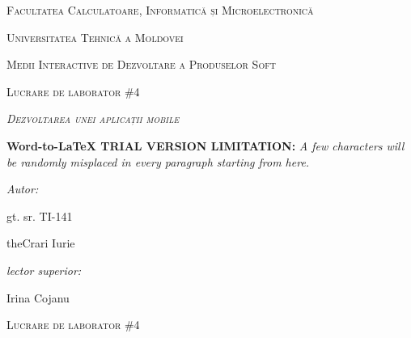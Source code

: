 \documentclass[11pt]{article}
\author{RePack by Diakov}
\title{}
\begin{document}
\begin{center}
\textsc{{\LARGE Facultatea Calculatoare, Informatic\u{a} și
Microelectronic\u{a}}}
\end{center}

\begin{center}
\textsc{{\LARGE Universitatea Tehnic\u{a} a Moldovei}}
\end{center}

\begin{center}
\textsc{{\LARGE Medii Interactive de Dezvoltare a Produselor Soft}}
\end{center}

\begin{center}
\textsc{{\LARGE Lucrare de laborator  \#4}}
\end{center}

\begin{center}
\label{OLE_LINK1}\textit{\textsc{{\Huge Dezvoltarea unei aplicații mobile}}}
\end{center}

\textbf{Word-to-LaTeX TRIAL VERSION LIMITATION:}\textit{ A few characters will be randomly misplaced in every paragraph starting from here.}

\begin{multicols}{2}

{\raggedright
\textit{{\large Autor:}}
}

{\raggedright
{\large gt. sr. TI-141 }
}

{\raggedright
{\large theCrari Iurie}
}

{\raggedleft
{\large \textit{lector superior:} }
}

{\raggedleft
{\large         Irina Cojanu}
}

\end{multicols}
\hspace{15pt}\hspace{15pt}\hspace{15pt}\hspace{15pt}\hspace{15pt}\hspace{15pt}\hspace{15pt}\hspace{15pt}\hspace{15pt}\hspace{15pt}\hspace{15pt}\hspace{15pt}\hspace{15pt}\hspace{15pt}
\begin{center}
\textsc{{\Large Lucrare de laborator  \#4}}
\end{center}
\end{document}
